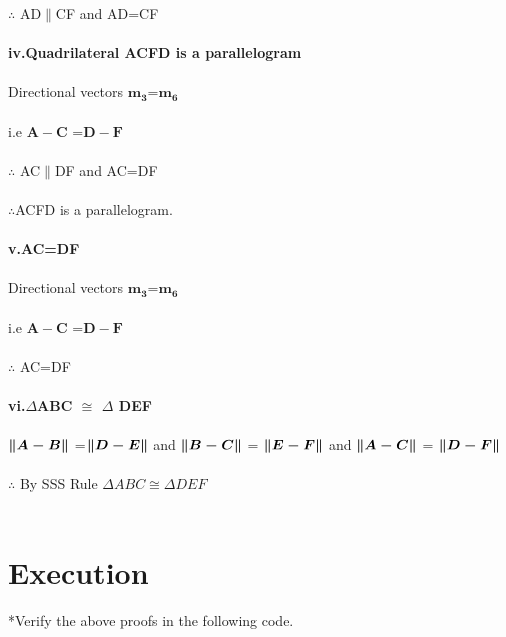 \documentclass[10pt, a4paper]{article}
\begin{document}
	$\therefore$ AD$\parallel$CF and AD=CF \\\\
\textbf{iv.Quadrilateral ACFD is a parallelogram}\\\\
Directional vectors $\boldsymbol{m_3}$=$\boldsymbol{m_6}$\\\\
i.e $\boldsymbol{{A}-{C}}$ =$\boldsymbol{{D}-{F}}$\\\\
   $\therefore$ AC$\parallel$DF and AC=DF \\\\
	 $\therefore$ACFD is a parallelogram.\\\\
\textbf{v.AC=DF}\\\\
 Directional vectors $\boldsymbol{m_3}$=$\boldsymbol{m_6}$\\\\
i.e $\boldsymbol{{A}-{C}}$ =$\boldsymbol{{D}-{F}}$\\\\
	$\therefore$ AC=DF\\\\
\textbf{vi.$\Delta $ABC $\cong$ $\Delta$ DEF}  \\\\
$\boldsymbol{\norm{A-B}}$ =$\boldsymbol{\norm{D-E}}$ and $\boldsymbol{\norm{B-C}}$ =  $\boldsymbol{\norm{E-F}}$ and $\boldsymbol{\norm{A-C}}$ =  $\boldsymbol{\norm{D-F}}$\\\\
$\therefore$ By SSS Rule $\Delta ABC \cong \Delta DEF$\\\\

\section{Execution}
*Verify the above proofs in the following code.\\

\end{document}
